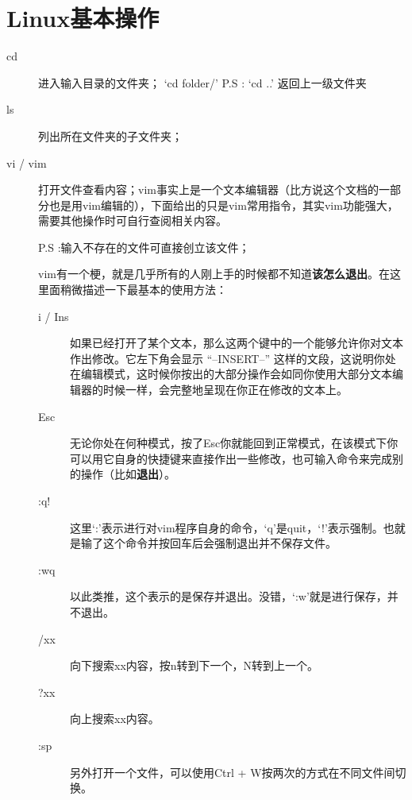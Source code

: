 \documentclass[12pt,a4paper,openany,twoside]{book}
\numberwithin{equation}{section}
\begin{document}
      \section{Linux基本操作}
        \begin{description}
          \item[cd]
            进入输入目录的文件夹；
            `cd folder/'
            P.S : `cd ..' 返回上一级文件夹
          \item[ls]
            列出所在文件夹的子文件夹；

          \item[vi / vim]
            打开文件查看内容；vim事实上是一个文本编辑器（比方说这个文档的一部分也是用vim编辑的），下面给出的只是vim常用指令，其实vim功能强大，需要其他操作时可自行查阅相关内容。

            P.S :输入不存在的文件可直接创立该文件；

            vim有一个梗，就是几乎所有的人刚上手的时候都不知道\textbf{该怎么退出}。在这里面稍微描述一下最基本的使用方法：
            \begin{description}
              \item[i / Ins] 如果已经打开了某个文本，那么这两个键中的一个能够允许你对文本作出修改。它左下角会显示 “--INSERT--” 这样的文段，这说明你处在编辑模式，这时候你按出的大部分操作会如同你使用大部分文本编辑器的时候一样，会完整地呈现在你正在修改的文本上。
          
              \item[Esc] 无论你处在何种模式，按了Esc你就能回到正常模式，在该模式下你可以用它自身的快捷键来直接作出一些修改，也可输入命令来完成别的操作（比如\textbf{退出}）。

              \item[:q!] 这里‘:’表示进行对vim程序自身的命令，‘q’是quit，‘!’表示强制。也就是输了这个命令并按回车后会强制退出并不保存文件。

              \item[:wq] 以此类推，这个表示的是保存并退出。没错，‘:w’就是进行保存，并不退出。
              
              \item[/xx] 向下搜索xx内容，按n转到下一个，N转到上一个。
              
              \item[?xx] 向上搜索xx内容。  
              
              \item[:sp] 另外打开一个文件，可以使用Ctrl + W按两次的方式在不同文件间切换。  
              

\end{description}
\end{description}
\end{document}
